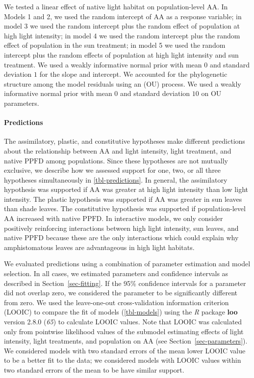 \documentclass[
  letterpaper,
  DIV=11,
  numbers=noendperiod]{scrartcl}
\let\oldparagraph\paragraph
\renewcommand{\paragraph}[1]{\oldparagraph{#1}\mbox{}}
\newcommand{\aax}{$\mathrm{AA}$}
\newcommand{\ppfd}{$\mathrm{PPFD}$}
\begin{document}
We tested a linear effect of native light habitat on population-level
\aax. In Models 1 and 2, we used the random intercept of \aax{} as a
response variable; in model 3 we used the random intercept plus the
random effect of population at high light intensity; in model 4 we used
the random intercept plus the random effect of population in the sun
treatment; in model 5 we used the random intercept plus the random
effects of population at high light intensity and sun treatment. We used
a weakly informative normal prior with mean \(0\) and standard deviation
\(1\) for the slope and intercept. We accounted for the phylogenetic
structure among the model residuals using an (OU) process. We used a
weakly informative normal prior with mean \(0\) and standard deviation
\(10\) on OU parameters.

\paragraph{Predictions}\label{sec-predictions}

The assimilatory, plastic, and constitutive hypotheses make different
predictions about the relationship between \aax{} and light intensity,
light treatment, and native \ppfd{} among populations. Since these
hypotheses are not mutually exclusive, we describe how we assessed
support for one, two, or all three hypotheses simultaneously in
\autoref{tbl-predictions}. In general, the assimilatory hypothesis was
supported if \aax{} was greater at high light intensity than low light
intensity. The plastic hypothesis was supported if \aax{} was greater in
sun leaves than shade leaves. The constitutive hypothesis was supported
if population-level \aax{} increased with native \ppfd. In interactive
models, we only consider positively reinforcing interactions between
high light intensity, sun leaves, and native \ppfd{} because these are
the only interactions which could explain why amphistomatous leaves are
advantageous in high light habitats.

We evaluated predictions using a combination of parameter estimation and
model selection. In all cases, we estimated parameters and confidence
intervals as described in Section~\ref{sec-fitting}. If the 95\%
confidence intervals for a parameter did not overlap zero, we considered
the parameter to be significantly different from zero. We used the
leave-one-out cross-validation information criterion (LOOIC) to compare
the fit of models (\autoref{tbl-models}) using the \emph{R} package
\textbf{loo} version 2.8.0 (\emph{65}) to calculate LOOIC values. Note
that LOOIC was calculated only from pointwise likelihood values of the
submodel estimating effects of light intensity, light treatments, and
population on \aax{} (see Section~\ref{sec-parameters}). We considered
models with two standard errors of the mean lower LOOIC value to be a
better fit to the data; we considered models with LOOIC values within
two standard errors of the mean to be have similar support.
\end{document}
